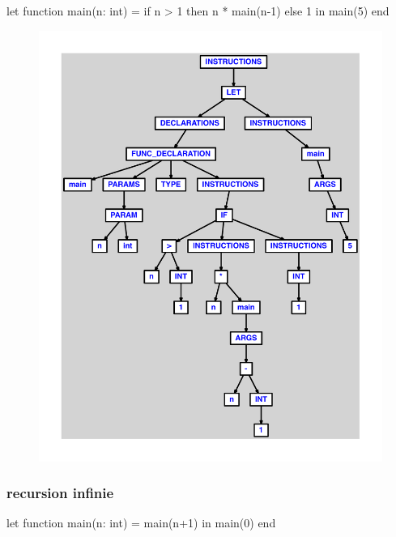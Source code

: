 \documentclass{article}
\begin{document}
\begin{verbatimtab}
let
	function main(n: int) =
		if n > 1 then
			n * main(n-1)
		else 1
in main(5) end
\end{verbatimtab}
\begin{figure}[H]\centering\includegraphics[max width=\textwidth]{ast/ast_237.pdf}\end{figure}\subsubsection{recursion infinie}
\begin{verbatimtab}
let
	function main(n: int) = main(n+1)
in main(0) end
\end{verbatimtab}
\end{document}
